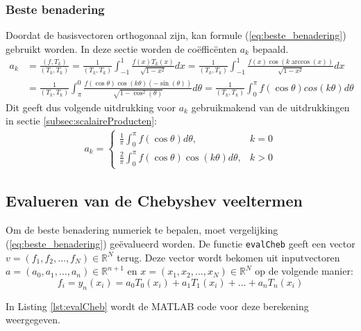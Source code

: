 \documentclass[a4paper, 12pt, titlepage, fleqn]{article}
\begin{document}
\subsubsection{Beste benadering}
Doordat de basisvectoren orthogonaal zijn, kan formule (\ref{eq:beste_benadering}) gebruikt worden. In deze sectie worden de co\"effic\"enten $a_k$ bepaald.
\begin{align*}
a_k &= \frac{(f,T_k)}{(T_k,T_k)} = \frac{1}{(T_k,T_k)}\int_{-1}^1\frac{f(x)T_k(x)}{\sqrt{1-x^2}}dx = \frac{1}{(T_k,T_k)}\int_{-1}^1\frac{f(x)\cos(k \arccos(x))}{\sqrt{1-x^2}}dx\\
&= \frac{1}{(T_k,T_k)}\int_\pi^0\frac{f(\cos \theta)\cos(k\theta)(-\sin(\theta))}{\sqrt{1-\cos^2(\theta)}}d\theta = \frac{1}{(T_k,T_k)}\int_0^\pi f(\cos \theta) cos(k\theta)d\theta
\end{align*}
Dit geeft dus volgende uitdrukking voor $a_k$ gebruikmakend van de uitdrukkingen in sectie \ref{subsec:scalaireProducten}:
\begin{align}
a_k = \begin{cases}
\frac{1}{\pi}\int_0^\pi f(\cos \theta)d\theta, & k = 0\\
\frac{2}{\pi}\int_0^\pi f(\cos \theta)\cos(k\theta)d\theta, & k > 0
\end{cases}
\label{eq:a_K}
\end{align}



\subsection{Evalueren van de Chebyshev veeltermen}
Om de beste benadering numeriek te bepalen, moet vergelijking (\ref{eq:beste_benadering}) ge\"evalueerd worden. De functie \texttt{evalCheb} geeft een vector $v = (f_1, f_2, \ldots, f_N) \in \mathbb{R}^N$ terug. Deze vector wordt bekomen uit inputvectoren $a = (a_0,a_1,\ldots, a_n) \in \mathbb{R}^{n+1}$ en $x = (x_1,x_2,\ldots,x_N) \in \mathbb{R}^N$ op de volgende manier:
\begin{equation*}
f_i = y_n(x_i) = a_0T_0(x_i) + a_1T_1(x_i) + \ldots + a_nT_n(x_i)
\end{equation*}

In Listing \ref{lst:evalCheb} wordt de MATLAB code voor deze berekening weergegeven.


\end{document}
